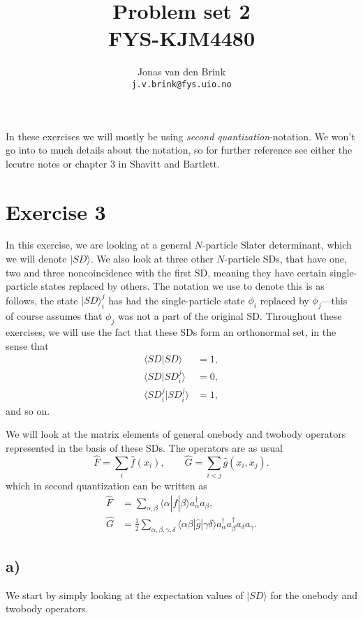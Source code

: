 \documentclass[a4paper, 11pt, notitlepage, english]{article}
\author{Jonas van den Brink \\ \texttt{j.v.brink@fys.uio.no}}
\title{Problem set 2 \\ FYS-KJM4480}
\newcommand{\ket}[1]{|#1 \rangle}
\newcommand{\braket}[2]{\langle #1 | #2 \rangle}
\newcommand{\op}[1]{\hat{#1}}
\newcommand{\braopket}[3]{\langle #1 | {#2} | #3 \rangle}
\begin{document}
\maketitle

In these exercises we will mostly be using \emph{second quantization}-notation. We won't go into to much details about the notation, so for further reference see either the lecutre notes or chapter 3 in Shavitt and Bartlett.

\section*{Exercise 3}
In this exercise, we are looking at a general $N$-particle Slater determinant, which we will denote $\ket{SD}$. We also look at three other $N$-particle SDs, that have one, two and three non\-coincidence with the first SD, meaning they have certain single-particle states replaced by others. The notation we use to denote this is as follows, the state $\ket{SD}_i^j$ has had the single-particle state $\phi_i$ replaced by $\phi_j$---this of course assumes that $\phi_j$ was not a part of the original SD. Throughout these exercises, we will use the fact that these SDs form an orthonormal set, in the sense that
\begin{align*}
\braket{SD}{SD} &= 1, \\
\braket{SD}{SD_i^j} &= 0, \\
\braket{SD_i^j}{SD_i^j} &= 1,
\end{align*}
and so on.

We will look at the matrix elements of general onebody and twobody operators represented in the basis of these SDs. The operators are as usual
$$\op{F} = \sum_i \op{f}(x_i), \qquad \op{G}=\sum_{i<j}\op{g}(x_i,x_j).$$
which in second quantization can be written as
\begin{align*}
\op{F} &= \sum_{\alpha, \beta} \braopket{\alpha}{\op{f}}{\beta}a_\alpha^\dag a_\beta, \\
\op{G} &= \frac{1}{2}\sum_{\alpha, \beta, \gamma, \delta} \braopket{\alpha\beta}{\op{g}}{\gamma\delta}a_\alpha^\dag a_\beta^\dag a_\delta a_\gamma.
\end{align*}

\clearpage

\subsection*{a)}
We start by simply looking at the expectation values of $\ket{SD}$ for the onebody and twobody operators.
\end{document}
